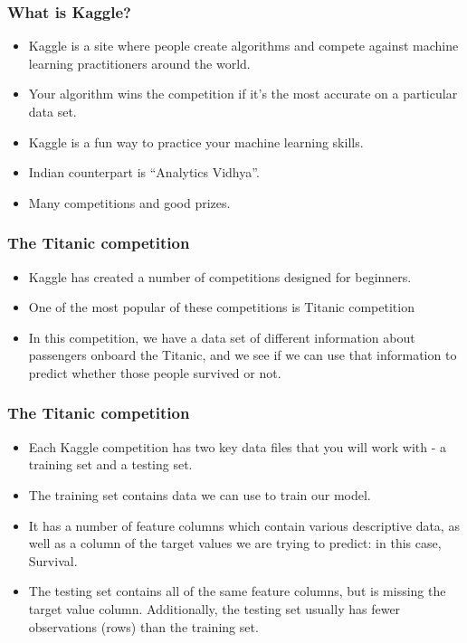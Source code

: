 \begin{frame}[fragile]\frametitle{What is Kaggle?}
\begin{itemize}
\item Kaggle is a site where people create algorithms and compete against machine learning practitioners around the world. 
\item Your algorithm wins the competition if it's the most accurate on a particular data set. 
\item Kaggle is a fun way to practice your machine learning skills.
\item Indian counterpart is ``Analytics Vidhya''. 
\item Many competitions and good prizes.
\end{itemize}
\end{frame}


\begin{frame}[fragile]\frametitle{The Titanic competition}
\begin{itemize}
\item Kaggle has created a number of competitions designed for beginners. 
\item One of the most popular of these competitions is Titanic competition
\item In this competition, we have a data set of different information about passengers onboard the Titanic, and we see if we can use that information to predict whether those people survived or not.
\end{itemize}
\end{frame}


\begin{frame}[fragile]\frametitle{The Titanic competition}
\begin{itemize}
\item Each Kaggle competition has two key data files that you will work with - a training set and a testing set.
\item The training set contains data we can use to train our model. 
\item It has a number of feature columns which contain various descriptive data, as well as a column of the target values we are trying to predict: in this case, Survival.
\item The testing set contains all of the same feature columns, but is missing the target value column. Additionally, the testing set usually has fewer observations (rows) than the training set.
\end{itemize}
\end{frame}

